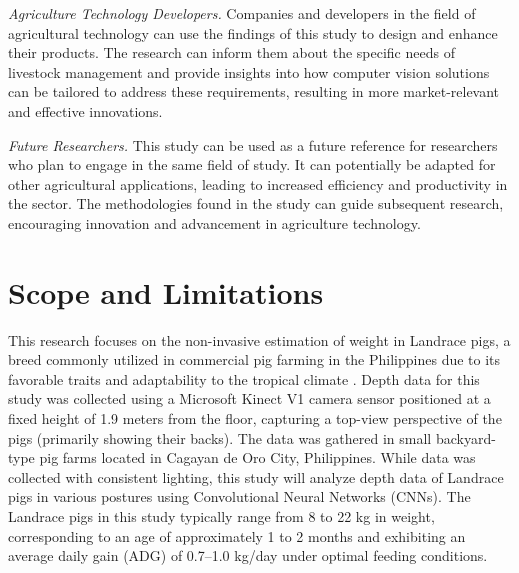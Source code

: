 {\textit{Agriculture Technology Developers.} Companies and developers in the field of agricultural technology can use the findings of this study to design and enhance their products. The research can inform them about the specific needs of livestock management and provide insights into how computer vision solutions can be tailored to address these requirements, resulting in more market-relevant and effective innovations.

\textit{Future Researchers.} This study can be used as a future reference for researchers who plan to engage in the same field of study. It can potentially be adapted for other agricultural applications, leading to increased efficiency and productivity in the sector. The methodologies found in the study can guide subsequent research, encouraging innovation and advancement in agriculture technology.

\section{Scope and Limitations}

This research focuses on the non-invasive estimation of weight in Landrace pigs, a breed commonly utilized in commercial pig farming in the Philippines due to its favorable traits and adaptability to the tropical climate \citep{Manez2020}. Depth data for this study was collected using a Microsoft Kinect V1 camera sensor positioned at a fixed height of 1.9 meters from the floor, capturing a top-view perspective of the pigs (primarily showing their backs). The data was gathered in small backyard-type pig farms located in Cagayan de Oro City, Philippines. While data was collected with consistent lighting, this study will analyze depth data of Landrace pigs in various postures using Convolutional Neural Networks (CNNs). The Landrace pigs in this study typically range from 8 to 22 kg in weight, corresponding to an age of approximately 1 to 2 months and exhibiting an average daily gain (ADG) of 0.7–1.0 kg/day under optimal feeding conditions.

}
